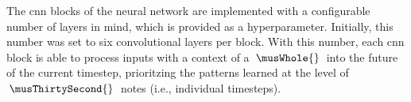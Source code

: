 
The \gls{cnn} blocks of the neural network are implemented
with a configurable number of layers in mind, which is
provided as a hyperparameter. Initially, this number was set
to six convolutional layers per block. With this number,
each \gls{cnn} block is able to process inputs with a
context of a $\: \musWhole{} \:$ into the future of the
current timestep, prioritzing the patterns learned at the
level of $\: \musThirtySecond{} \:$ notes (i.e., individual
timesteps).
